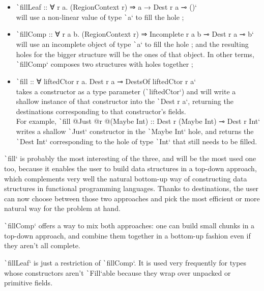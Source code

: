 \documentclass[english]{jflart}
\begin{document}
\begin{itemize}
  \item \texttt`fillLeaf :: ∀ r a. (RegionContext r) ⇒ a → Dest r a ⊸ ()` \\will use a non-linear value of type \texttt`a` to fill the hole ;
  \item \texttt`fillComp :: ∀ r a b. (RegionContext r) ⇒ Incomplete r a b ⊸ Dest r a ⊸ b` \\will use an incomplete object of type \texttt`a` to fill the hole ; and the resulting holes for the bigger structure will be the ones of that object. In other terms, \texttt`fillComp` composes two structures with holes together ;
  \item \texttt`fill :: ∀ liftedCtor r a. Dest r a ⊸ DestsOf liftedCtor r a` \\takes a constructor as a type parameter (\texttt`liftedCtor`) and will write a shallow instance of that constructor into the \texttt`Dest r a`, returning the destinations corresponding to that constructor's fields.\\ For example, \texttt`fill @Just @r @(Maybe Int) :: Dest r (Maybe Int) ⊸ Dest r Int` writes a shallow \texttt`Just` constructor in the \texttt`Maybe Int` hole, and returns the \texttt`Dest Int` corresponding to the hole of type \texttt`Int` that still needs to be filled.
\end{itemize}

\texttt`fill` is probably the most interesting of the three, and will be the most used one too, because it enables the user to build data structures in a top-down approach, which complements very well the natural bottom-up way of constructing data structures in functional programming languages. Thanks to destinations, the user can now choose between those two approaches and pick the most efficient or more natural way for the problem at hand.

\texttt`fillComp` offers a way to mix both approaches: one can build small chunks in a top-down approach, and combine them together in a bottom-up fashion even if they aren't all complete.

\texttt`fillLeaf` is just a restriction of \texttt`fillComp`. It is used very frequently for types whose constructors aren't \texttt`Fill`able because they wrap over unpacked or primitive fields.
\end{document}
